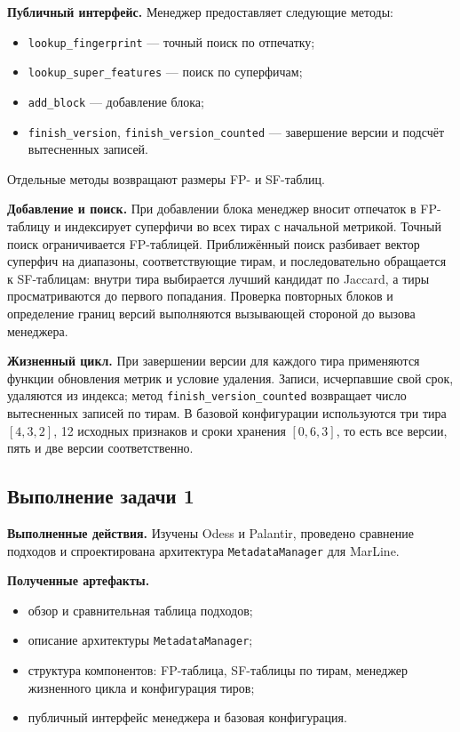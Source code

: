 \documentclass[a4paper]{article}
\begin{document}
\textbf{Публичный интерфейс.} Менеджер предоставляет следующие методы:
\begin{itemize}
    \item \texttt{lookup\_fingerprint} --- точный поиск по отпечатку;
    \item \texttt{lookup\_super\_features} --- поиск по суперфичам;
    \item \texttt{add\_block} --- добавление блока;
    \item \texttt{finish\_version}, \texttt{finish\_version\_counted} ---
    завершение версии и подсчёт вытесненных записей.
\end{itemize}
Отдельные методы возвращают размеры FP- и SF-таблиц.

\textbf{Добавление и поиск.} При добавлении блока менеджер вносит отпечаток в
FP-таблицу и индексирует суперфичи во всех тирах с начальной метрикой.
Точный поиск ограничивается FP-таблицей. Приближённый поиск разбивает вектор
суперфич на диапазоны, соответствующие тирам, и последовательно обращается к
SF-таблицам: внутри тира выбирается лучший кандидат по Jaccard, а тиры
просматриваются до первого попадания. Проверка повторных блоков и определение
границ версий выполняются вызывающей стороной до вызова менеджера.

\textbf{Жизненный цикл.} При завершении версии для каждого тира применяются
функции обновления метрик и условие удаления. Записи, исчерпавшие свой срок,
удаляются из индекса; метод \texttt{finish\_version\_counted} возвращает число
вытесненных записей по тирам. В базовой конфигурации используются три тира
\([4, 3, 2]\), 12 исходных признаков и сроки хранения \([0, 6, 3]\), то есть
все версии, пять и две версии соответственно.

\subsection{Выполнение задачи 1}

\textbf{Выполненные действия.} Изучены Odess и Palantir, проведено сравнение
подходов и спроектирована архитектура \texttt{MetadataManager} для MarLine.

\textbf{Полученные артефакты.}
\begin{itemize}
    \item обзор и сравнительная таблица подходов;
    \item описание архитектуры \texttt{MetadataManager};
    \item структура компонентов: FP-таблица, SF-таблицы по тирам, менеджер
    жизненного цикла и конфигурация тиров;
    \item публичный интерфейс менеджера и базовая конфигурация.
\end{itemize}
\end{document}

